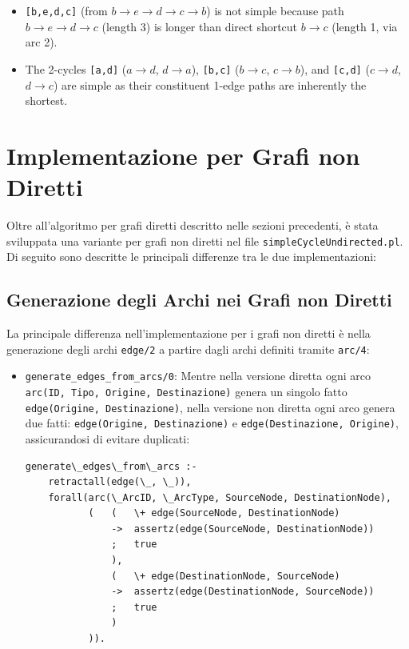 \documentclass[12pt,a4paper]{article}
\begin{document}
\begin{itemize}
\begin{itemize}
\item \texttt{[b,e,d,c]} (from $b \rightarrow e \rightarrow d \rightarrow c \rightarrow b$) is not simple because path $b \rightarrow e \rightarrow d \rightarrow c$ (length 3) is longer than direct shortcut $b \rightarrow c$ (length 1, via arc 2). 
\item The 2-cycles \texttt{[a,d]} ($a \rightarrow d$, $d \rightarrow a$), \texttt{[b,c]} ($b \rightarrow c$, $c \rightarrow b$), and \texttt{[c,d]} ($c \rightarrow d$, $d \rightarrow c$) are simple as their constituent 1-edge paths are inherently the shortest. 
\end{itemize}
\end{itemize}

\section{Implementazione per Grafi non Diretti}

Oltre all'algoritmo per grafi diretti descritto nelle sezioni precedenti, è stata sviluppata una variante per grafi non diretti nel file \texttt{simpleCycleUndirected.pl}. Di seguito sono descritte le principali differenze tra le due implementazioni:

\subsection{Generazione degli Archi nei Grafi non Diretti}
La principale differenza nell'implementazione per i grafi non diretti è nella generazione degli archi \texttt{edge/2} a partire dagli archi definiti tramite \texttt{arc/4}:

\begin{itemize}
\item \texttt{generate\_edges\_from\_arcs/0}: Mentre nella versione diretta ogni arco \texttt{arc(ID, Tipo, Origine, Destinazione)} genera un singolo fatto \texttt{edge(Origine, Destinazione)}, nella versione non diretta ogni arco genera due fatti: \texttt{edge(Origine, Destinazione)} e \texttt{edge(Destinazione, Origine)}, assicurandosi di evitare duplicati:

\begin{lstlisting}[style=prologstyle, basicstyle=\ttfamily\footnotesize]
generate\_edges\_from\_arcs :-
    retractall(edge(\_, \_)),
    forall(arc(\_ArcID, \_ArcType, SourceNode, DestinationNode),
           (   (   \+ edge(SourceNode, DestinationNode)
               ->  assertz(edge(SourceNode, DestinationNode))
               ;   true
               ),
               (   \+ edge(DestinationNode, SourceNode)
               ->  assertz(edge(DestinationNode, SourceNode))
               ;   true
               )
           )).
\end{lstlisting}
\end{itemize}
\end{document}
